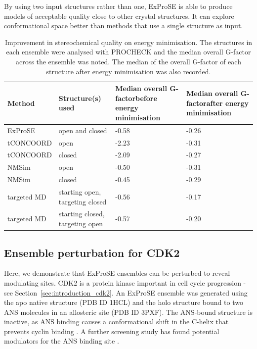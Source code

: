 By using two input structures rather than one, ExProSE is able to produce models of acceptable quality close to other crystal structures.
It can explore conformational space better than methods that use a single structure as input.


\begin{table}
\centering

\begin{footnotesize}
\begin{tabular}{ l l p{3cm} p{3cm} }
\hline
\textbf{Method} & \textbf{Structure(s) used} & \textbf{Median overall G-factor\newline before energy minimisation} & \textbf{Median overall G-factor\newline after energy minimisation} \\
\hline
ExProSE     & open and closed                 & -0.58 & -0.26 \\
tCONCOORD   & open                            & -2.23 & -0.31 \\
tCONCOORD   & closed                          & -2.09 & -0.27 \\
NMSim       & open                            & -0.50 & -0.31 \\
NMSim       & closed                          & -0.45 & -0.29 \\
targeted MD & starting open, targeting closed & -0.56 & -0.17 \\
targeted MD & starting closed, targeting open & -0.57 & -0.20 \\
\hline
\end{tabular}
\end{footnotesize}

\caption[Improvement in stereochemical quality of generated structures on energy minimisation]
{Improvement in stereochemical quality on energy minimisation.
The structures in each ensemble were analysed with PROCHECK and the median overall G-factor across the ensemble was noted.
The median of the overall G-factor of each structure after energy minimisation was also recorded.}

\label{tab:energy_minimisation}
\end{table}


\subsection{Ensemble perturbation for CDK2}

Here, we demonstrate that ExProSE ensembles can be perturbed to reveal modulating sites.
CDK2 is a protein kinase important in cell cycle progression - see Section~\ref{sec:introduction_cdk2}.
An ExProSE ensemble was generated using the apo native structure (PDB ID 1HCL) and the holo structure bound to two ANS molecules in an allosteric site (PDB ID 3PXF).
The ANS-bound structure is inactive, as ANS binding causes a conformational shift in the \textalpha C-helix that prevents cyclin binding \cite{Betzi2011}.
A further screening study has found potential modulators for the ANS binding site \cite{Rastelli2014}.

